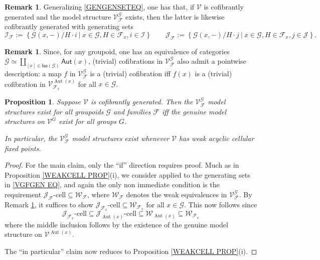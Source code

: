 \documentclass[a4paper,10pt
,draft
]{article}%
\numberwithin{equation}{section}
\numberwithin{figure}{section}
\newtheorem{proposition}[equation]{Proposition}%
\theoremstyle{definition} %
\newtheorem{remark}[equation]{Remark}%
\DeclareMathOperator{\Aut}{Aut}%
\newcommand{\F}{\ensuremath{\mathcal F}}
\newcommand{\V}{\ensuremath{\mathcal V}}
\newcommand{\G}{\ensuremath{\mathcal G}}
\newcommand{\1}{\ensuremath{\mathbbm 1}}%
\begin{document}
\begin{remark}\label{VGFGEN REM}
	Generalizing \eqref{GENGENSETEQ}, one has that,
	if $\V$ is cofibrantly generated and 
	the model structure $\V^{\G}_{\F}$ exists,
	then the latter is likewise cofibrantly generated with generating sets
\begin{equation}\label{VGFGEN EQ}
	\mathcal I_{\F} := \left\{
	\G(x,-)/H \cdot i
	\ | \ x \in \G, H \in \F_x, i\in \mathcal{I}
	\right\}
	\qquad
	\mathcal J_{\F} := \left\{
	\G(x,-)/H \cdot j
	\ | \ x \in \G, H \in \F_x, j\in \mathcal{J}
	\right\}.
\end{equation}
\end{remark}


\begin{remark}\label{SIGMACOF_REM}
	Since, for any groupoid, one has an equivalence of categories
	$\mathcal{G} \simeq 
	\coprod_{[x] \in \mathsf{Iso}(\mathcal{G})}
	\mathsf{Aut}(x)$,
	(trivial) cofibrations in $\V^{\G}_{\F}$
	also admit a pointwise description: 
	a map $f$ in $\V^\G_\F$ is a (trivial) cofibration iff $f(x)$ is a (trivial) cofibration in $\V^{\Aut(x)}_{\F_x}$ for all $x \in \G$.
\end{remark}



\begin{proposition}\label{ALLEQ PROP}
Suppose $\V$ is cofibrantly generated.
%
Then the $\V^{\G}_{\F}$
model structures exist for all 
groupoids $\G$ and families $\F$
iff
the genuine model structures on $\V^G$
exist for all groups $G$.

In particular, the $\V^{\G}_{\F}$
model structures exist whenever $\V$ has weak acyclic cellular fixed points.
\end{proposition}

\begin{proof}
For the main claim, only the ``if'' direction requires proof.
Much as in Proposition \ref{WEAKCELL PROP}(i), 
we consider \cite[Theorem 2.1.19]{Hov99}
applied to the generating sets in \eqref{VGFGEN EQ},
and again the only non immediate condition is the requirement
$\mathcal{J}_{\F}\text{-cell} \subseteq \mathcal{W}_{\F}$,
where $\mathcal{W}_{\F}$ denotes the weak equivalences 
in $\V^{\G}_{\F}$.
By Remark \ref{SIGMACOF_REM}, it suffices to show 
$\mathcal{J}_{\F_x}\text{-cell} \subseteq \mathcal{W}_{\F_x}$
for all $x \in \G$.
This now follows since
\begin{equation}\label{FAMTOGEN EQ}
\mathcal{J}_{\F_x}\text{-cell} \subseteq 
\mathcal{J}_{\Aut(x)}\text{-cell} \subseteq 
\mathcal{W}_{\Aut(x)} \subseteq 
\mathcal{W}_{\F_x}
\end{equation}
where the middle inclusion follows by the existence of the 
genuine model structure on $\V^{\Aut(x)}$.

The ``in particular'' claim now reduces to Proposition \ref{WEAKCELL PROP}(i).
\end{proof}
\end{document}
